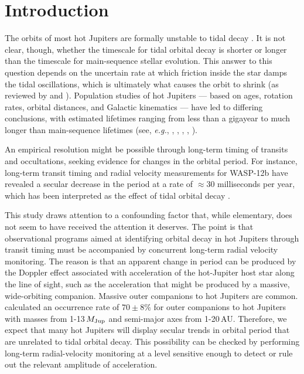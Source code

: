 \documentclass[12pt,twocolumn,tighten,trackchanges]{aastex62}
\begin{document}


\section{Introduction}

The orbits of most hot Jupiters are formally unstable to tidal decay
\citep{counselman_outcomes_1973,hut_stability_1980,rasio_tidal_1996,levrard_falling_2009,matsumura_tidal_2010}.
It is not clear, though, whether the timescale for tidal orbital decay
is shorter or longer than the timescale for main-sequence stellar
evolution.  This answer to this question depends on the uncertain rate
at which friction inside the star damps the tidal oscillations, which
is ultimately what causes the orbit to shrink (as reviewed by
\citealt{Mazeh2008} and \citealt{ogilvie_tidal_2014}).  Population
studies of hot Jupiters --- based on ages, rotation rates, orbital
distances, and Galactic kinematics --- have led to differing
conclusions, with estimated lifetimes ranging from less than a
gigayear to much longer than main-sequence lifetimes (see, {\it e.g.},
\citealt{jackson_observational_2009}, \citealt{teitler_why_2014},
\citealt{penev_empirical_2018}, \citealt{cameron_hierarchical_2018},
\citealt{hamer_schlaufman_2019}).

An empirical resolution might be possible through long-term timing of
transits and occultations, seeking evidence for changes in the orbital
period.  For instance, long-term transit timing and radial velocity
measurements for WASP-12b have revealed a secular decrease in the
period at a rate of $\approx$30 milliseconds per year, which has been
interpreted as the effect of tidal orbital decay
\citep{maciejewski_departure_2016,patra_2017,maciejewski_planet-star_2018,yee_orbit_2020}.

This study draws attention to a confounding factor that, while
elementary, does not seem to have received the attention it deserves.
The point is that observational programs aimed at identifying orbital
decay in hot Jupiters through transit timing must be accompanied by
concurrent long-term radial velocity monitoring.  The reason is that
an apparent change in period can be produced by the Doppler effect
associated with acceleration of the hot-Jupiter host star along the
line of sight, such as the acceleration that might be produced by a
massive, wide-orbiting companion.  Massive outer companions to hot
Jupiters are common.  \citet{bryan_statistics_2016} calculated an
occurrence rate of $70\pm8\%$ for outer companions to hot Jupiters
with masses from 1-13$\,$$M_{\rm Jup}$ and semi-major axes from
1-20$\,$AU.  Therefore, we expect that many hot Jupiters will display
secular trends in orbital period that are unrelated to tidal orbital
decay.  This possibility can be checked by performing long-term
radial-velocity monitoring at a level sensitive enough to detect or
rule out the relevant amplitude of acceleration.
\end{document}
